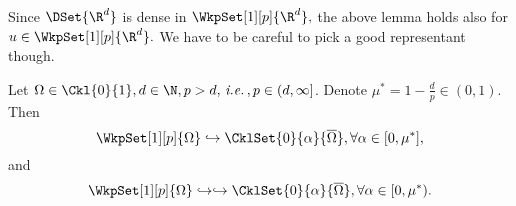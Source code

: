 \begin{remark}
    Since $\DSet{\R^{d}}$ is dense in $\WkpSet[1][p]{\R^{d}},$ the above lemma holds also for $u \in \WkpSet[1][p]{\R^{d}}.$ We have to be careful to pick a good representant though.
\end{remark}



\begin{theorem}
	Let $\Omega \in \Ckl{0}{1}, d \in \N, p > d, \, \text{\textit{i.e.}} \,, p \in (d, \infty]$. Denote $\mu^{*} = 1 - \frac{d}{p} \in (0,1).$ Then
	\[
		\WkpSet[1][p]{\Omega} \hookrightarrow \CklSet{0}{\alpha}{\overline{\Omega}}, \forall \alpha \in [0,\mu^{*}],
	\]
	and
	\[
		\WkpSet[1][p]{\Omega} \hookrightarrow \hookrightarrow \CklSet{0}{\alpha}{\overline{\Omega}}, \forall \alpha \in [0, \mu^{*}).
	\]
\end{theorem}

